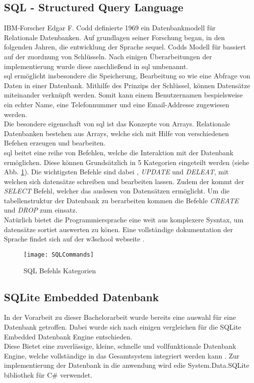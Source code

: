 \subsection{SQL - Structured Query Language}
IBM-Forscher Edgar F. Codd definierte 1969 ein Datenbankmodell für Relationale Datenbanken. Auf grundlagen seiner Forschung began, in den folgenden Jahren, die entwicklung der Sprache \ac{sequel}. Codds Modell für bassiert auf der zuordnung von Schlüsseln. Nach einigen Überarbeitungen der implementierung wurde diese anschließend in \ac{sql} umbenannt.\\
\ac{sql} ermöglicht insbesondere die Speicherung, Bearbeitung so wie eine Abfrage von Daten in einer Datenbank. Mithilfe des Prinzips der Schlüssel, können Datensätze miteinander verknüpft werden. Somit kann einem Benutzernamen bespielsweise ein echter Name, eine Telefonnummer und eine Email-Addresse zugewiesen werden.\\
Die besondere eigenschaft von \ac{sql} ist das Konzepte von Arrays. Relationale Datenbanken bestehen aus Arrays, welche sich mit Hilfe von verschiedenen Befehen erzeugen und bearbeiten. \cite{sql}\\
\ac{sql} beitet eine reihe von Befehlen, welche die Interaktion mit der Datenbank ermöglichen. Diese können Grundsätzlich in 5 Kategorien eingeteilt werden (siehe Abb. \ref{fig:SQLCommands}). Die wichtigsten Befehle sind dabei , \textit{UPDATE} und \textit{DELEAT}, mit welchen sich datensätze schreiben und bearbeiten lassen. Zudem der kommt der \textit{SELECT} Befehl, welcher das auslesen von Datensätzen ermöglicht. Um die tabellenstruktur der Datenbank zu berarbeiten kommen die Befehle \textit{CREATE} und \textit{DROP} zum einsatz. \cite{SQLCommands}\\
Natürlich bietet die Programmiersprache eine weit aus komplexere Sysntax, um datensätze sortiet auswerten zu könen. Eine vollständige dokumentation der Sprache findet sich auf der w3school webseite \cite{SQLDoku}.
\begin{center}
    \begin{figure}[h!]
     \centering
     \texttt{[image: SQLCommands]}
     \caption{SQL Befehls Kategorien \cite{SQLCommands}}
    \label{fig:SQLCommands}
    \end{figure}
   \end{center}

\subsection{SQLite Embedded Datenbank}
In der Vorarbeit zu dieser Bachelorarbeit wurde bereits eine auswahl für eine Datenbank getroffen. Dabei wurde sich nach einigen vergleichen für die SQLite Embedded Datenbank Engine entschieden. \\
Diese Bietet eine zuverlässige, kleine, schnelle und vollfunktionale Datenbank Engine, welche vollständige in das Gesamtsystem integriert werden kann \cite{SQLiteHompage}. Zur implementierung der Datenbank in die anwendung wird edie System.Data.SQLite bibliothek für C\# verwendet.\\